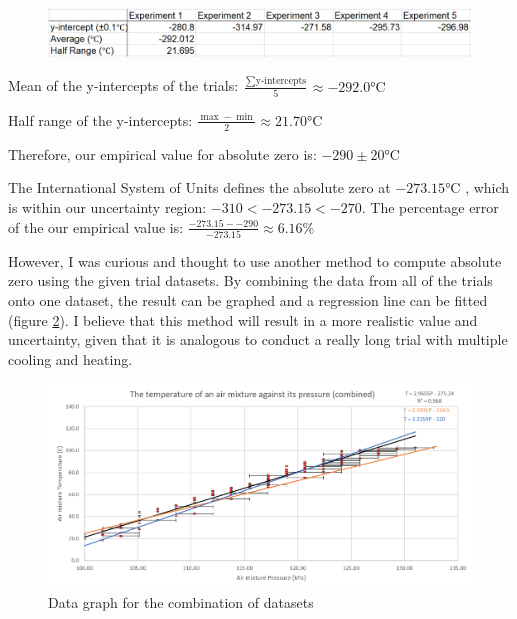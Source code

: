 \documentclass[a4paper,12pt]{article}
\begin{document}
\begin{figure}[H]
    \centering
    \includegraphics[scale=0.4]{assets/azerodata.png}
    \label{fig:yi}
\end{figure}


Mean of the y-intercepts of the trials: $\frac{\sum \text{y-intercepts}}{5} \approx -292.0 \si{\celsius}$

Half range of the y-intercepts: $\frac{\max - \min}{2} \approx 21.70 \si{\celsius}$

Therefore, our empirical value for absolute zero is: $-290 \pm 20 \si{\celsius}$

The International System of Units defines the absolute zero at $-273.15\si{\celsius}$ \parencite{si_form}, which is within our uncertainty region: $-310 < -273.15 < -270$. The percentage error of the our empirical value is: $\frac{-273.15- -290}{-273.15} \approx 6.16\%$

However, I was curious and thought to use another method to compute absolute zero using the given trial datasets. By combining the data from all of the trials onto one dataset, the result can be graphed and a regression line can be fitted (figure \ref{fig:comb}). I believe that this method will result in a more realistic value and uncertainty, given that it is analogous to conduct a really long trial with multiple cooling and heating.

\begin{figure}[H]
    \centering
    \includegraphics[width=\textwidth]{assets/combinedgraph.png}
    \caption{Data graph for the combination of datasets}
    \label{fig:comb}
\end{figure}
\end{document}
